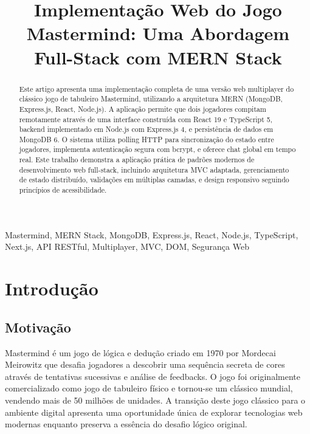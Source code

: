\documentclass[conference]{IEEEtran}
\begin{document}
\title{Implementação Web do Jogo Mastermind: Uma Abordagem Full-Stack com MERN Stack}

\author{
}

\maketitle

\begin{abstract}
Este artigo apresenta uma implementação completa de uma versão web multiplayer do clássico jogo de tabuleiro Mastermind, utilizando a arquitetura MERN (MongoDB, Express.js, React, Node.js). A aplicação permite que dois jogadores compitam remotamente através de uma interface construída com React 19 e TypeScript 5, backend implementado em Node.js com Express.js 4, e persistência de dados em MongoDB 6. O sistema utiliza polling HTTP para sincronização do estado entre jogadores, implementa autenticação segura com bcrypt, e oferece chat global em tempo real. Este trabalho demonstra a aplicação prática de padrões modernos de desenvolvimento web full-stack, incluindo arquitetura MVC adaptada, gerenciamento de estado distribuído, validações em múltiplas camadas, e design responsivo seguindo princípios de acessibilidade.
\end{abstract}

\begin{IEEEkeywords}
Mastermind, MERN Stack, MongoDB, Express.js, React, Node.js, TypeScript, Next.js, API RESTful, Multiplayer, MVC, DOM, Segurança Web
\end{IEEEkeywords}

\section{Introdução}

\subsection{Motivação}
Mastermind é um jogo de lógica e dedução criado em 1970 por Mordecai Meirowitz que desafia jogadores a descobrir uma sequência secreta de cores através de tentativas sucessivas e análise de feedbacks. O jogo foi originalmente comercializado como jogo de tabuleiro físico e tornou-se um clássico mundial, vendendo mais de 50 milhões de unidades. A transição deste jogo clássico para o ambiente digital apresenta uma oportunidade única de explorar tecnologias web modernas enquanto preserva a essência do desafio lógico original.
\end{document}
